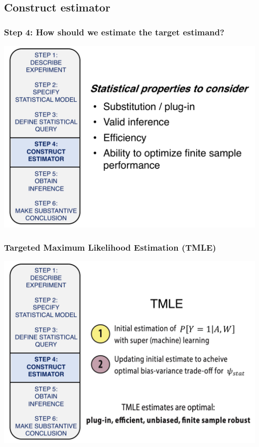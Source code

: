 \documentclass[t]{beamer}
\begin{document}
\subsection{Construct estimator}
\begin{frame}
  \frametitle{Step 4: How should we estimate the target estimand?}
  \vspace{-20pt}
  \begin{center}
  \includegraphics[width = 1.05\textwidth]{figures/roadmap4.pdf}
  \end{center}
\end{frame}

\begin{frame}
  \frametitle{Targeted Maximum Likelihood Estimation (TMLE)}
  \vspace{-20pt}
  \begin{center}
  \includegraphics[width = 1.05\textwidth]{figures/tmle.pdf}
  \end{center}
\end{frame}
\end{document}
